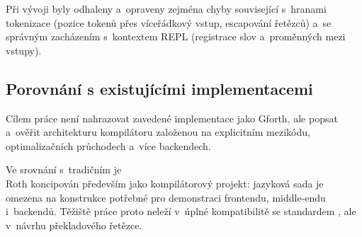 Při vývoji byly odhaleny a~opraveny zejména chyby související s~hranami
tokenizace (pozice tokenů přes víceřádkový vstup, escapování řetězců) a~se
správným zacházením s~kontextem REPL (registrace slov a~proměnných mezi vstupy).

\subsection{Porovnání s existujícími implementacemi}

Cílem práce není nahrazovat zavedené implementace jako Gforth, ale popsat
a~ověřit architekturu kompilátoru založenou na explicitním mezikódu,
optimalizačních průchodech a~více backendech.

Ve srovnání s~tradičním \Forth{} je \\Roth{} koncipován především jako
kompilátorový projekt: jazyková sada je omezena na konstrukce potřebné pro
demonstraci frontendu, middle-endu i~backendů. Těžiště práce proto neleží
v~úplné kompatibilitě se standardem \Forth{}, ale v~návrhu překladového řetězce.
